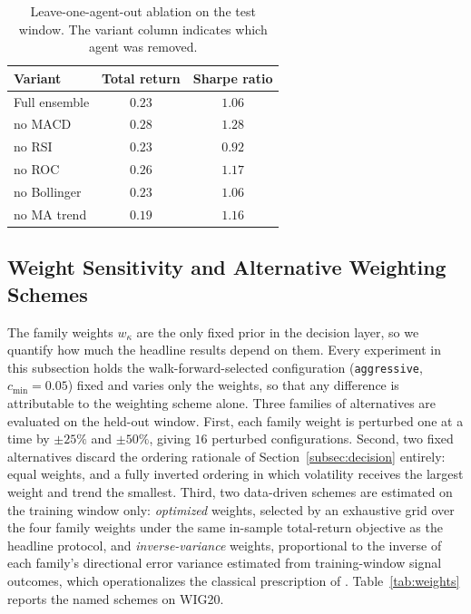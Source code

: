\documentclass{ieeeaccess}
\newcommand{\TRtest}{\ensuremath{0.23}}
\newcommand{\Shtest}{\ensuremath{1.06}}
\newcommand{\BestMode}{\texttt{aggressive}}
\newcommand{\BestMinConf}{\ensuremath{0.05}}
\newcommand{\WSPerturbN}{\ensuremath{16}}
\begin{document}
\begin{table}[t]
\centering
\caption{Leave-one-agent-out ablation on the test window. The variant column indicates which agent was removed.}
\label{tab:ablation}
\begin{tabular}{lcc}
\toprule
Variant & Total return & Sharpe ratio \\
\midrule
Full ensemble & $\TRtest$ & $\Shtest$ \\
no MACD        & $0.28$ & $1.28$ \\
no RSI         & $0.23$ & $0.92$ \\
no ROC         & $0.26$ & $1.17$ \\
no Bollinger   & $0.23$ & $1.06$ \\
no MA trend    & $0.19$ & $1.16$ \\
\bottomrule
\end{tabular}
\end{table}

\subsection{Weight Sensitivity and Alternative Weighting Schemes}
\label{subsec:weights}

The family weights $w_\kappa$ are the only fixed prior in the decision layer, so we quantify how much the headline results depend on them. Every experiment in this subsection holds the walk-forward-selected configuration (\BestMode{}, $c_{\min} = \BestMinConf{}$) fixed and varies only the weights, so that any difference is attributable to the weighting scheme alone. Three families of alternatives are evaluated on the held-out window. First, each family weight is perturbed one at a time by $\pm 25\%$ and $\pm 50\%$, giving \WSPerturbN{} perturbed configurations. Second, two fixed alternatives discard the ordering rationale of Section~\ref{subsec:decision} entirely: equal weights, and a fully inverted ordering in which volatility receives the largest weight and trend the smallest. Third, two data-driven schemes are estimated on the training window only: \emph{optimized} weights, selected by an exhaustive grid over the four family weights under the same in-sample total-return objective as the headline protocol, and \emph{inverse-variance} weights, proportional to the inverse of each family's directional error variance estimated from training-window signal outcomes, which operationalizes the classical prescription of \cite{batesgranger1969}. Table~\ref{tab:weights} reports the named schemes on WIG20.
\end{document}
